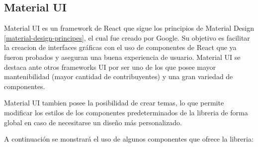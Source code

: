     \subsection{Material UI}
        
        Material UI es un framework de React que sigue los principios de Material Design \ref*{material-design-principes}, el cual fue creado por Google. Su objetivo es facilitar la creacion de interfaces gráficas con el uso de componentes de React que ya fueron probados y aseguran una buena experiencia de usuario. Material UI se destaca ante otros frameworks UI por ser uno de los que posee mayor mantenibilidad (mayor cantidad de contribuyentes) y una gran variedad de componentes.

        Material UI tambien posee la posibilidad de crear temas, lo que permite modificar los estilos de los componentes predeterminados de la libreria de forma global en caso de necesitarse un diseño más personalizado.

        A continuación se monstrará el uso de algunos componentes que ofrece la libreria:
        
